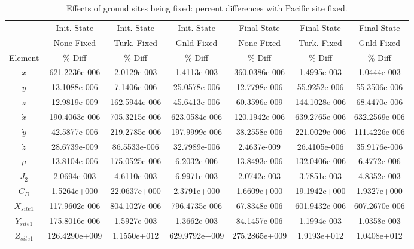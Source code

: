 \documentclass[]{aiaa-tc}%
\begin{document}
	\begin{table}[H]%
		\begin{center}
			\caption{Effects of ground sites being fixed: percent differences with Pacific site fixed.}
			\label{t:GSFixed}
			\begin{tabular}{c|c|c|c|c|c|c}
\hline & Init. State & Init. State &  Init. State & Final State & Final State & Final State \\
 &None Fixed & Turk. Fixed &  Gnld Fixed & None Fixed & Turk. Fixed & Gnld Fixed\\ 
Element & \%-Diff & \%-Diff & \%-Diff & \%-Diff & \%-Diff & \%-Diff \\ \hline
$x$         &    621.2236e-006 &    2.0129e-003 &    1.4113e-003 &  360.0386e-006 &    1.4995e-003 &    1.0444e-003 \\
$y$         &     13.1088e-006 &    7.1406e-006 &   25.0578e-006 &   12.7798e-006 &   55.9252e-006 &   55.3506e-006 \\
$z$         &     12.9819e-009 &  162.5944e-006 &   45.6413e-006 &   60.3596e-009 &  144.1028e-006 &   68.4470e-006 \\
$\dot{x}$   &    190.4063e-006 &  705.3215e-006 &  623.0584e-006 &  120.1942e-006 &  639.2765e-006 &  632.2569e-006 \\
$\dot{y}$   &     42.5877e-006 &  219.2785e-006 &  197.9999e-006 &   38.2558e-006 &  221.0029e-006 &  111.4226e-006 \\
$\dot{z}$   &     28.6739e-009 &   86.5533e-006 &   32.7989e-006 &    2.4637e-009 &   26.4105e-006 &   35.9176e-006 \\
$\mu$       &     13.8104e-006 &  175.0525e-006 &    6.2032e-006 &   13.8493e-006 &  132.0406e-006 &    6.4772e-006 \\
$J_2$       &      2.0694e-003 &    4.6110e-003 &    6.9971e-003 &    2.0742e-003 &    3.7851e-003 &    4.8352e-003 \\
$C_D$       &      1.5264e+000 &   22.0637e+000 &    2.3791e+000 &    1.6609e+000 &   19.1942e+000 &    1.9327e+000 \\
$X_{site1}$ &    117.9602e-006 &  804.1027e-006 &  796.4735e-006 &   67.8348e-006 &  601.9432e-006 &  607.2670e-006 \\
$Y_{site1}$ &    175.8016e-006 &    1.5927e-003 &    1.3662e-003 &   84.1457e-006 &    1.1994e-003 &    1.0358e-003 \\
$Z_{site1}$ &    126.4290e+009 &    1.1550e+012 &  629.9792e+009 &  275.2865e+009 &    1.9193e+012 &    1.0408e+012 \\

\end{tabular}
\end{center}
\end{table}
\end{document}
